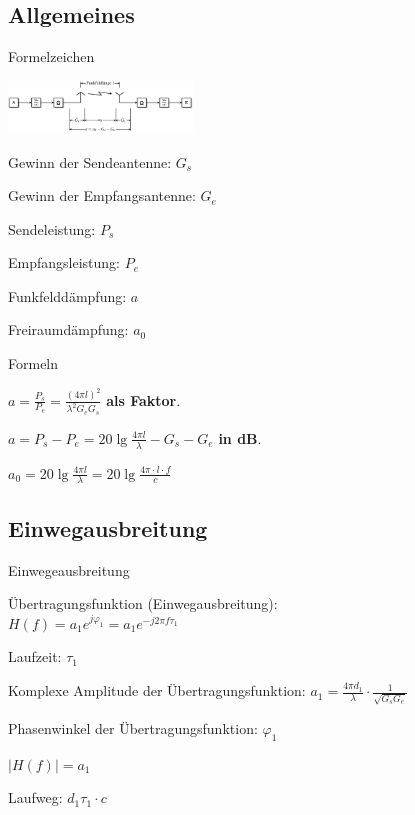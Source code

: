 \documentclass[german]{latex4ei/latex4ei_sheet}
\begin{document}
    \subsection{Allgemeines}
    \begin{sectionbox}
        \begin{symbolbox}{Formelzeichen}
            \item \includegraphics[width=185px]{img/Funkuebertragungssystem.png}
            \item Gewinn der Sendeantenne: $G_s$
            \item Gewinn der Empfangsantenne: $G_e$
            \item Sendeleistung: $P_s$
            \item Empfangsleistung: $P_e$
            \item Funkfelddämpfung: $a$
            \item Freiraumdämpfung: $a_0$
        \end{symbolbox}
        
        \begin{bluebox}{Formeln}
            \item $a = \frac{P_s}{P_e} = \frac{(4\pi l)^2}{\lambda^2 G_e G_s}$ \textbf{als Faktor}.
            \item $a = P_s - P_e = 20\lg \frac{4\pi l}{\lambda}-G_s-G_e$ \textbf{in dB}.
            \item $a_0 = 20\lg \frac{4\pi l}{\lambda} = 20\lg \frac{4\pi\cdot l \cdot f}{c}$
        \end{bluebox}
    \end{sectionbox}
    \begin{sectionbox}   
        \subsection{Einwegausbreitung}
    \begin{symbolbox}{Einwegeausbreitung}
        \item Übertragungsfunktion (Einwegausbreitung):\\ $H(f) = a_1 e^{j\varphi_1} = a_1 e^{-j 2 \pi f \tau_1}$
        \item Laufzeit: $\tau_1$
        \item Komplexe Amplitude der Übertragungsfunktion: $a_1 = \frac{4\pi d_1}{\lambda}\cdot \frac{1}{\sqrt{G_s G_e}}$
        \item Phasenwinkel der Übertragungsfunktion: $\varphi_1$
        \item $|H(f)| = a_1$
        \item Laufweg: $d_1\tau_1 \cdot c$
    \end{symbolbox}
\end{sectionbox}
    
\end{document}
